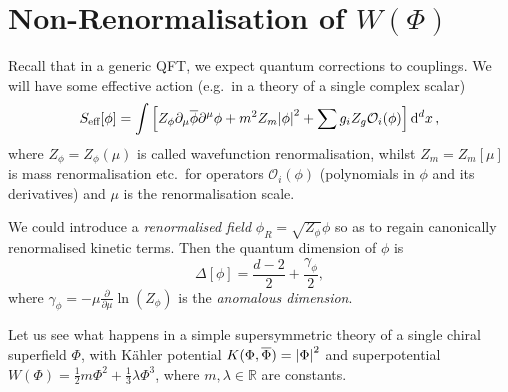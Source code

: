 
\section{Non-Renormalisation of \texorpdfstring{$W(\Phi)$}{the Superpotential}}%
\label{sec:non_renormalisation_of_s_phi}

Recall that in a generic QFT, we expect quantum corrections to couplings.
We will have some effective action (e.g.~in a theory of a single complex scalar)
\begin{equation}
  S_{\text{eff}}[\phi] = \int \left[Z_\phi \partial_{\mu} \overline{\phi}{} \partial^{\mu} \phi + m^2 Z_m \abs{\phi}^2 + \sum g_i Z_g \mathcal{O}_i(\phi)\right] \dd[d]{x},
\end{equation}
where $Z_\phi = Z_\phi (\mu)$ is called wavefunction renormalisation, whilst $Z_m = Z_m[\mu]$ is mass renormalisation etc.~for operators $\mathcal{O}_i(\phi)$ (polynomials in $\phi$ and its derivatives) and $\mu$ is the renormalisation scale.

We could introduce a \emph{renormalised field} $\phi_R = \sqrt{Z_\phi} \phi$ so as to regain canonically renormalised kinetic terms.
Then the quantum dimension of $\phi$ is 
\begin{equation}
  \Delta[\phi] = \frac{d - 2}{2} + \frac{\gamma_\phi}{2},
\end{equation}
where $\gamma_\phi = - \mu \frac{\partial }{\partial \mu} \ln (Z_\phi)$ is the \emph{anomalous dimension}.

Let us see what happens in a simple supersymmetric theory of a single chiral superfield $\Phi$, with Kähler potential $K({\Phi}, \overline{\Phi}{}) = \abs{\Phi}^2$ and superpotential $W(\Phi) = \frac{1}{2} m \Phi^2 + \frac{1}{3} \lambda \Phi^3$, where $m, \lambda \in \mathbb{R}$ are constants.

